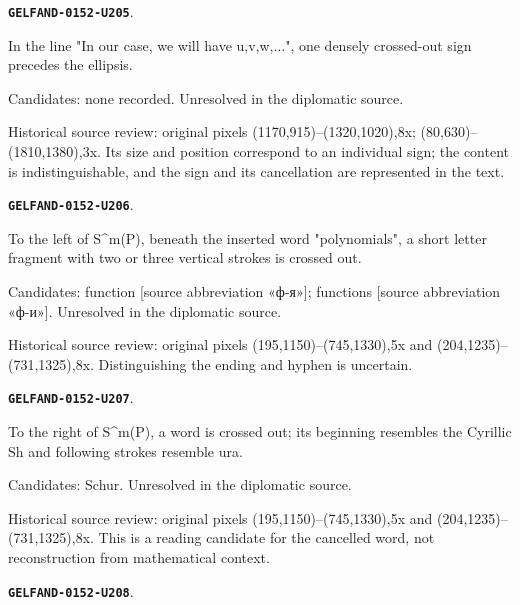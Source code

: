 \documentclass[11pt]{article}
\theoremstyle{definition}
\theoremstyle{remark}
\begin{document}
\par\noindent\leavevmode{}\label{GELFAND-0152-U205}\label{GELFAND-P001399:cancelled-after-w:note}\textbf{\texttt{GELFAND-0152-U205}}.\nopagebreak[4]\par
In the line "In our case, we will have u,v,w,...", one densely crossed-out sign precedes the ellipsis.\par
Candidates: none recorded. Unresolved in the diplomatic source.\par
Historical source review: original pixels (1170,915)–(1320,1020),8x; (80,630)–(1810,1380),3x. Its size and position correspond to an individual sign; the content is indistinguishable, and the sign and its cancellation are represented in the text.\par\medskip
\par\noindent\leavevmode{}\label{GELFAND-0152-U206}\label{GELFAND-P001399:cancelled-before-sm:note}\textbf{\texttt{GELFAND-0152-U206}}.\nopagebreak[4]\par
To the left of S\textasciicircum{}m(P), beneath the inserted word "polynomials", a short letter fragment with two or three vertical strokes is crossed out.\par
Candidates: function [source abbreviation «ф-я»]; functions [source abbreviation «ф-и»]. Unresolved in the diplomatic source.\par
Historical source review: original pixels (195,1150)–(745,1330),5x and (204,1235)–(731,1325),8x. Distinguishing the ending and hyphen is uncertain.\par\medskip
\par\noindent\leavevmode{}\label{GELFAND-0152-U207}\label{GELFAND-P001399:cancelled-after-sm:note}\textbf{\texttt{GELFAND-0152-U207}}.\nopagebreak[4]\par
To the right of S\textasciicircum{}m(P), a word is crossed out; its beginning resembles the Cyrillic Sh and following strokes resemble ura.\par
Candidates: Schur. Unresolved in the diplomatic source.\par
Historical source review: original pixels (195,1150)–(745,1330),5x and (204,1235)–(731,1325),8x. This is a reading candidate for the cancelled word, not reconstruction from mathematical context.\par\medskip
\par\noindent\leavevmode{}\label{GELFAND-0152-U208}\label{GELFAND-P001399:equation-2-lower-bound:note}\textbf{\texttt{GELFAND-0152-U208}}.\nopagebreak[4]\par
\end{document}
